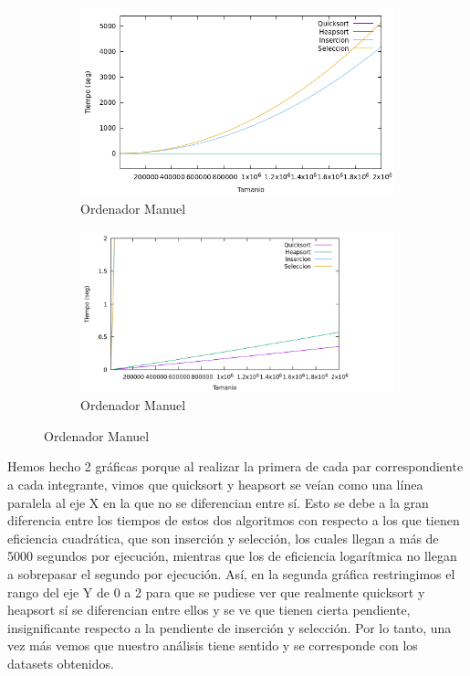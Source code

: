 \documentclass[10pt,a4paper]{article}
\begin{document}
\begin{figure}[h!]
	\begin{subfigure}{.5\textwidth}
		\centering
		\includegraphics[scale=0.35]{../../Images/Grafica_comparativa_algoritmos_ordenacion_ManuelMoya.png}
		\caption{Ordenador Manuel}
	\end{subfigure}
	\hfill
	\begin{subfigure}{.5\textwidth}
		\centering
		\includegraphics[scale=0.15]{../../Images/Grafica_comparativa_algoritmos_ordenacion_ManuelMoya_(HyQ).png}
		\caption{Ordenador Manuel}
	\end{subfigure}
\end{figure}

Hemos hecho 2 gráficas porque al realizar la primera de cada par correspondiente a cada integrante, vimos que quicksort y heapsort se veían como una línea paralela al eje X en la que no se diferencian entre sí. Esto se debe a la gran diferencia entre los tiempos de estos dos algoritmos con respecto a los que tienen eficiencia cuadrática, que son inserción y selección, los cuales llegan a más de 5000 segundos por ejecución, mientras que los de eficiencia logarítmica no llegan a sobrepasar el segundo por ejecución. Así, en la segunda gráfica restringimos el rango del eje Y de 0 a 2 para que se pudiese ver que realmente quicksort y heapsort sí se diferencian entre ellos y se ve que tienen cierta pendiente, insignificante respecto a la pendiente de inserción y selección. Por lo tanto, una vez más vemos que nuestro análisis tiene sentido y se corresponde con los datasets obtenidos.
\end{document}
